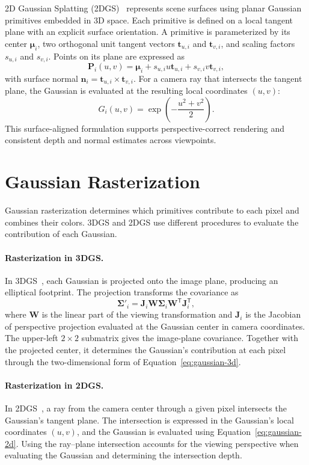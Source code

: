 2D Gaussian Splatting (2DGS)~\cite{huang2024} represents scene surfaces using planar Gaussian primitives embedded in 3D space. Each primitive is defined on a local tangent plane with an explicit surface orientation. A primitive is parameterized by its center \(\boldsymbol{\mu}_i\), two orthogonal unit tangent vectors \(\mathbf{t}_{u,i}\) and \(\mathbf{t}_{v,i}\), and scaling factors \(s_{u,i}\) and \(s_{v,i}\). Points on its plane are expressed as
\[
  \mathbf{P}_i(u,v) =
  \boldsymbol{\mu}_i + s_{u,i}u\mathbf{t}_{u,i} + s_{v,i}v\mathbf{t}_{v,i},
\]
with surface normal \(\mathbf{n}_i = \mathbf{t}_{u,i} \times \mathbf{t}_{v,i}\). For a camera ray that intersects the tangent plane, the Gaussian is evaluated at the resulting local coordinates \((u,v)\):
\begin{equation}
  G_i(u,v) = \exp\left(-\frac{u^2 + v^2}{2}\right).
  \label{eq:gaussian-2d}
\end{equation}
This surface-aligned formulation supports perspective-correct rendering and consistent depth and normal estimates across viewpoints.

\section{Gaussian Rasterization}

Gaussian rasterization determines which primitives contribute to each pixel and combines their colors. 3DGS and 2DGS use different procedures to evaluate the contribution of each Gaussian.

\paragraph{Rasterization in 3DGS.}
In 3DGS~\cite{kerbl2023}, each Gaussian is projected onto the image plane, producing an elliptical footprint. The projection transforms the covariance as
\[
  \boldsymbol{\Sigma}'_i =
  \mathbf{J}_i\mathbf{W}\boldsymbol{\Sigma}_i
  \mathbf{W}^{\mathsf{T}}\mathbf{J}_i^{\mathsf{T}},
\]
where \(\mathbf{W}\) is the linear part of the viewing transformation and \(\mathbf{J}_i\) is the Jacobian of perspective projection evaluated at the Gaussian center in camera coordinates. The upper-left \(2 \times 2\) submatrix gives the image-plane covariance. Together with the projected center, it determines the Gaussian's contribution at each pixel through the two-dimensional form of Equation~\eqref{eq:gaussian-3d}.

\paragraph{Rasterization in 2DGS.}
In 2DGS~\cite{huang2024}, a ray from the camera center through a given pixel intersects the Gaussian's tangent plane. The intersection is expressed in the Gaussian's local coordinates \((u,v)\), and the Gaussian is evaluated using Equation~\eqref{eq:gaussian-2d}. Using the ray--plane intersection accounts for the viewing perspective when evaluating the Gaussian and determining the intersection depth.

